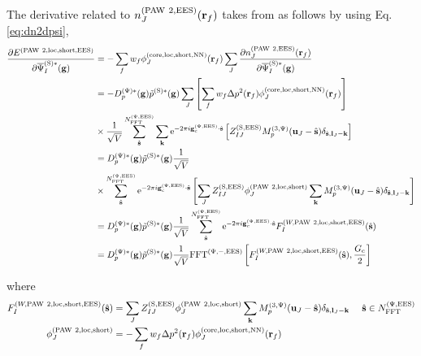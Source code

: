 \documentclass[paper=a4, fontsize=11pt]{article} %
\numberwithin{equation}{section} %
\numberwithin{figure}{section} %
\numberwithin{table}{section} %
\newcommand{\p}{\partial}
\newcommand{\bu}{{\bf{u}}}
\newcommand{\bl}{{\bf{l}}}
\newcommand{\bk}{{\bf{k}}}
\newcommand{\bs}{{\bf{s}}}
\newcommand{\bg}{{\bf{g}}}
\newcommand{\br}{{\bf{r}}}
\newcommand{\hs}{{\hat{\bf{s}}}}
\newcommand{\rS}{{\mathrm{S}}}
\newcommand{\rEES}{{\mathrm{EES}}}
\newcommand{\rcore}{{\mathrm{core}}}
\newcommand{\rNN}{{\mathrm{NN}}}
\newcommand{\re}{{\mathrm{e}}}
\newcommand{\rshort}{{\mathrm{short}}}
\newcommand{\rP}{{\mathrm{PAW}}}
\newcommand{\rlo}{{\mathrm{loc}}}
\newcommand{\gcpEES}{{\bg_c^{(\Psi,\rEES)}}}
\newcommand{\igcps}{2\pi i\gcpEES\cdot\hat \bs}
\newcommand{\psigsc}{{\overline \Psi_I^{(\rS)*}(\bg)}}
\newcommand{\NFFTpEES}{{N^{\mathrm{(\Psi,\rEES})}_{\mathrm{FFT}}}}
\newcommand{\hGc}{{\frac{G_{\mathrm{c}}}{2}}}
\newcommand{\Dpgc}{{D^{(\Psi)*}_p(\bg)}}
\newcommand{\Mp}{{M_p^{(3,\Psi)}}}
\newcommand{\FFTpiEES}{{\mathrm{FFT}^{(\Psi,-,\rEES)}}}
\newcommand{\hsinpEES}{{\ \ \ \ \hs \in \NFFTpEES}}
\begin{document}
\vspace{2mm}
The derivative related to $n_J^{(\rP\ 2,\rEES)}(\br_f)$ takes from as follows by using Eq.\eqref{eq:dn2dpsi},
\begin{equation}
\begin{split}
\frac{\p E^{(\rP\ 2,\rlo,\rshort,\rEES)}}{\p \psigsc}
&= - \sum_f w_f \phi_J^{(\rcore,\rlo,\rshort,\rNN)}(\br_f)\sum_J \frac{\p n_J^{(\rP\ 2,\rEES)}(\br_f)}{\p \psigsc} \\
&= - \Dpgc \tilde p^{(\rS)*}(\bg)  \sum_J  \left[\sum_f w_f \Delta p^2(\br_f) \phi_J^{(\rcore,\rlo,\rshort,\rNN)}(\br_f)\right]\\
&\times\frac{1}{\sqrt{V}}\sum_{\hat \bs}^\NFFTpEES \sum_{\bk} \re^{-\igcps} \left[ Z_{IJ}^{(\rS,\rEES)} \Mp(\bu_{J}-\hat \bs)\delta_{\hat \bs,\bl_J-\bk} \right] \\
&= \Dpgc \tilde p^{(\rS)*}(\bg)  \frac{1}{\sqrt{V}}\\
&\times\sum_{\hat \bs}^\NFFTpEES \re^{-\igcps} \left[\sum_J  Z_{IJ}^{(\rS,\rEES)} \phi_J^{(\rP\ 2,\rlo,\rshort)}  \sum_{\bk}  \Mp(\bu_{J}-\hat \bs)\delta_{\hat \bs,\bl_J-\bk} \right] \\
&= \Dpgc\tilde p^{(\rS)*}(\bg)\frac{1}{\sqrt{V}}\sum_{\hat \bs}^\NFFTpEES \re^{-\igcps}F_I^{(W,\rP\ 2,\rlo,\rshort,\rEES)}(\hs) \\
&= \Dpgc\tilde p^{(\rS)*}(\bg)\frac{1}{\sqrt{V}}\FFTpiEES \left[F_I^{(W,\rP\ 2,\rlo,\rshort,\rEES)}(\hs),\hGc \right]\\
\end{split}
\end{equation}

where
\begin{equation}
\begin{split}
F_I^{(W,\rP\ 2,\rlo,\rshort,\rEES)}(\hs) &= \sum_J  Z_{IJ}^{(\rS,\rEES)} \phi_J^{(\rP\ 2,\rlo,\rshort)} \sum_{\bk}  \Mp(\bu_{J}-\hat \bs)\delta_{\hat \bs,\bl_J-\bk} \hsinpEES \\
\phi_J^{(\rP\ 2,\rlo,\rshort)}&= -\sum_f w_f \Delta p^2(\br_f) \phi_J^{(\rcore,\rlo,\rshort,\rNN)}(\br_f) \\
\end{split}
\end{equation}
\end{document}
